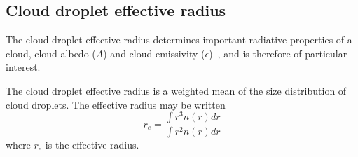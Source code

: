 
\subsection{Cloud droplet effective radius}
The cloud droplet effective radius determines important radiative properties of a cloud, cloud albedo ($A$) and cloud emissivity ($\epsilon$)~\citep{Hansen1974}, and is therefore of particular interest.

The cloud droplet effective radius is a weighted mean of the size distribution of cloud droplets. The effective radius may be written
\begin{equation}
r_e = \frac{\int r^3 n(r) dr}{\int r^2 n(r) dr}
\end{equation}
where $r_e$ is the effective radius.





